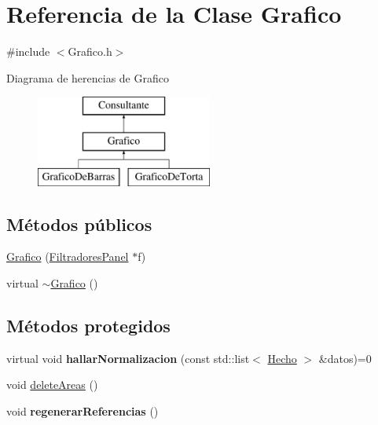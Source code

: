 \hypertarget{classGrafico}{\section{\-Referencia de la \-Clase \-Grafico}
\label{classGrafico}
}


{\ttfamily \#include $<$\-Grafico.\-h$>$}

\-Diagrama de herencias de \-Grafico\begin{figure}[H]
\begin{center}
\leavevmode
\includegraphics[height=3.000000cm]{classGrafico}
\end{center}
\end{figure}
\subsection*{\-Métodos públicos}
\begin{DoxyCompactItemize}
\item 
\hyperlink{classGrafico_ae432e5a7b909182132551b359a6a1ea3}{\-Grafico} (\hyperlink{classFiltradoresPanel}{\-Filtradores\-Panel} $\ast$f)
\item 
virtual \hyperlink{classGrafico_a1db5d0b80dfa9467542b37278a4f9f66}{$\sim$\-Grafico} ()
\end{DoxyCompactItemize}
\subsection*{\-Métodos protegidos}
\begin{DoxyCompactItemize}
\item 
\hypertarget{classGrafico_a3ea17dc3e92eb867069eab9331891e03}{virtual void {\bfseries hallar\-Normalizacion} (const std\-::list$<$ \hyperlink{classHecho}{\-Hecho} $>$ \&datos)=0}\label{classGrafico_a3ea17dc3e92eb867069eab9331891e03}

\item 
void \hyperlink{classGrafico_a3abd6861308594594d76f09f61087e95}{delete\-Areas} ()
\item 
\hypertarget{classGrafico_a664b44ea30af98769a2c8ba9c07e3743}{void {\bfseries regenerar\-Referencias} ()}\label{classGrafico_a664b44ea30af98769a2c8ba9c07e3743}

\end{DoxyCompactItemize}
